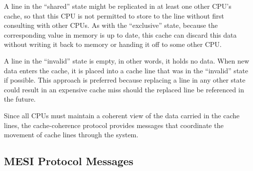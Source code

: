 A line in the ``shared'' state might be replicated in at least
one other CPU's cache, so that this CPU is not permitted to store
to the line without first consulting with other CPUs.
As with the ``exclusive'' state, because the corresponding value
in memory is up to date,
this cache can discard this data without writing it back to memory
or handing it off to some other CPU.

A line in the ``invalid'' state is empty, in other words, it holds
no data.
When new data enters the cache, it is placed into a
cache line that was in the ``invalid'' state if possible.
This approach is preferred because replacing a line in any other
state could result in an expensive cache miss should the replaced
line be referenced in the future.

Since all CPUs must maintain a coherent view of the data carried in
the cache lines, the cache-coherence protocol provides messages
that coordinate the movement of cache lines through the system.

\subsection{MESI Protocol Messages}
\label{sec:app:whymb:MESI Protocol Messages}

